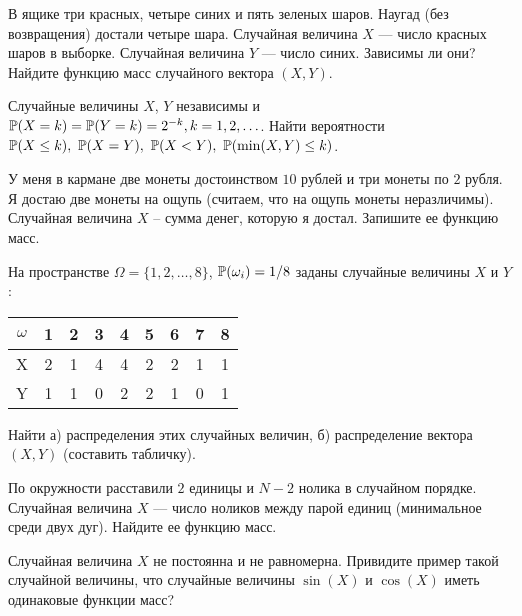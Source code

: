 \begin{problem}
    В ящике три красных, четыре синих и пять зеленых шаров.
    Наугад (без возвращения) достали четыре шара.
    Случайная величина $X$ — число красных шаров в выборке.
    Случайная величина $Y$ — число синих.
    Зависимы ли они?
    Найдите функцию масс случайного вектора $(X, Y)$.
\end{problem}

\begin{problem}
    Случайные величины $X$, $Y$ независимы и $\operatorname{\mathbb{P}}(X = k) = \operatorname{\mathbb{P}}(Y = k) = 2^{-k}, k = 1, 2, \ldots$.
    Найти вероятности $\PP(X \leq k),\ \PP(X = Y),\ \PP(X < Y),\ \PP(\min(X, Y) \leq k)$.
\end{problem}

\begin{problem}
    У меня в кармане две монеты достоинством $10$ рублей и три монеты по $2$ рубля.
    Я достаю две монеты на ощупь (считаем, что на ощупь монеты неразличимы).
    Случайная величина $X$ -- сумма денег, которую я достал.
    Запишите ее функцию масс.
\end{problem}

\begin{problem}
    На пространстве $\Omega = \{1, 2, \ldots, 8\}$, $\operatorname{\mathbb{P}}(\omega_i) = 1 / 8$ заданы случайные величины $X$ и $Y$:
    \begin{center}
    \begin{tabular}{c|c|c|c|c|c|c|c|c}
        $\omega$ & 1 & 2 & 3 & 4 & 5 & 6 & 7 & 8 \\
        \hline
        X & 2 & 1 & 4 & 4 & 2 & 2 & 1 & 1 \\
        \hline
        Y & 1 & 1 & 0 & 2 & 2 & 1 & 0 & 1 \\
    \end{tabular}
    \end{center}
    Найти а) распределения этих случайных величин, б) распределение вектора $(X, Y)$ (составить табличку).
\end{problem}

\begin{problem}
    По окружности расставили $2$ единицы и $N - 2$ нолика в случайном порядке.
    Случайная величина $X$ — число ноликов между парой единиц (минимальное среди двух дуг).
    Найдите ее функцию масс.
\end{problem}

\begin{problem}
    Случайная величина $X$ не постоянна и не равномерна.
    Привидите пример такой случайной величины, что случайные величины $\sin(X)$ и $\cos(X)$ иметь одинаковые функции масс?
\end{problem}

